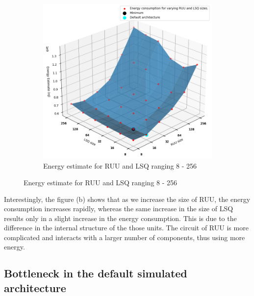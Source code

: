 \documentclass[11pt]{article}
\begin{document}
\begin{figure}[H]
\begin{subfigure}{.5\textwidth}
    \includegraphics[width=1.0\textwidth]{"../plots/vary-ruu-lsq-3d-energy-good-angle.png"}
    \caption{Energy estimate for RUU and LSQ ranging 8 - 256}
    \label{fig:sub2}
  \end{subfigure}
\end{figure}
\vspace{-1em}

Interestingly, the figure (b) shows that as we increase the size of RUU, the
energy consumption increases rapidly, whereas the same increase in the size of
LSQ results only in a slight increase in the energy consumption. This is due to
the difference in the internal structure of the those units. The circuit of RUU
is more complicated and interacts with a larger number of components, thus
using more energy.

\vspace{-1em}
\subsection*{Bottleneck in the default simulated architecture}
\vspace{-0.5em}
\end{document}
